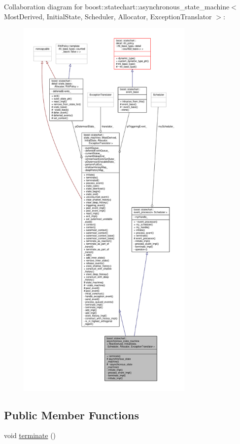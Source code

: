Collaboration diagram for boost\+:\+:statechart\+:\+:asynchronous\+\_\+state\+\_\+machine$<$ Most\+Derived, Initial\+State, Scheduler, Allocator, Exception\+Translator $>$\+:
\nopagebreak
\begin{figure}[H]
\begin{center}
\leavevmode
\includegraphics[height=550pt]{classboost_1_1statechart_1_1asynchronous__state__machine__coll__graph}
\end{center}
\end{figure}
\subsection*{Public Member Functions}
\begin{DoxyCompactItemize}
\item 
void \mbox{\hyperlink{classboost_1_1statechart_1_1asynchronous__state__machine_aeb5ac2e3a0f539b313544357ae2be26d}{terminate}} ()
\end{DoxyCompactItemize}
